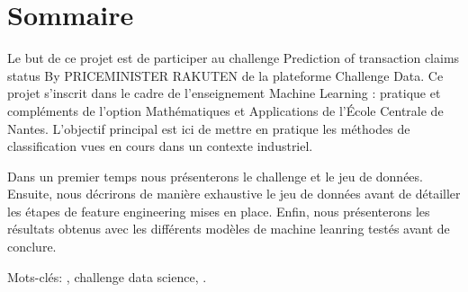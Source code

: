 
\chapter{Sommaire}

Le but de ce projet est de participer au challenge Prediction of transaction claims 
status By PRICEMINISTER RAKUTEN de la plateforme Challenge Data. Ce projet s'inscrit dans
le cadre de l'enseignement Machine Learning : pratique et compléments de l'option
Mathématiques et Applications de l'École Centrale de Nantes. L'objectif principal est ici
de mettre en pratique les méthodes de classification vues en cours dans un contexte 
industriel.

Dans un premier temps nous présenterons le challenge et le jeu de données. Ensuite, nous 
décrirons de manière exhaustive le jeu de données avant de détailler les étapes de
feature engineering mises en place. Enfin, nous présenterons les résultats obtenus avec
les différents modèles de machine leanring testés avant de conclure.

\vspace{1cm}

Mots-clés: , challenge data science, \Python.

\vfill
